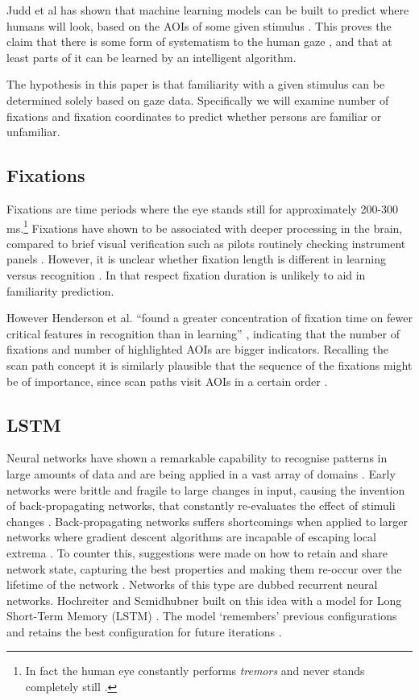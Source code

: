 \documentclass{llncs}
\begin{document}
Judd et al has shown that machine learning models can be built to predict where humans will look, based on the AOIs of some given stimulus \cite{judd2009}. This proves the claim that there is some form of systematism to the human gaze \cite{noton1971,holmqvist2011,judd2009,rayner1998}, and that at least parts of it can be learned by an intelligent algorithm.

The hypothesis in this paper is that familiarity with a given stimulus can be determined solely based on gaze data.
Specifically we will examine number of fixations and fixation coordinates to predict whether persons are familiar or unfamiliar.

\subsection{Fixations}
Fixations are time periods where the eye stands still for approximately 200-300 ms\cite{holmqvist2011}.\footnote{In fact the human  
eye constantly performs \textit{tremors} and never stands completely still \cite{holmqvist2011}.} Fixations have shown to be
associated with deeper processing in the brain, compared to brief visual verification such as pilots routinely checking
instrument panels \cite{rayner1998, holmqvist2011}. However, it is unclear whether fixation length is different in learning 
versus recognition \cite{henderson2005}. In that respect fixation duration is unlikely to aid in familiarity prediction. 

However Henderson et al. ``found a greater concentration of fixation time on fewer critical features in recognition
than in learning'' \cite[p. 104]{henderson2005}, indicating that the number of fixations and number of highlighted AOIs are 
bigger indicators. Recalling the scan path concept it is similarly plausible that the sequence of the fixations might be
of importance, since scan paths visit AOIs in a certain order \cite{holmqvist2011}.

\subsection{LSTM}
Neural networks have shown a remarkable capability to recognise patterns in large amounts of data and are being 
applied in a vast array of domains \cite{schmidhuber2015,nilsson2009}. Early networks were brittle and fragile to large
changes in input, causing the invention of back-propagating networks, that constantly re-evaluates the effect of stimuli
changes \cite{schmidhuber2015,russel2014}. Back-propagating networks suffers shortcomings when applied to larger networks where gradient descent algorithms are incapable of escaping local extrema \cite{russel2014}. To counter this, suggestions were made on how to retain and share network state, capturing the best properties and making them re-occur over the lifetime of the network \cite{russel2014, nilsson2009}. Networks of this type are dubbed recurrent neural networks. Hochreiter and Scmidhubner built on this idea with a model for Long Short-Term Memory (LSTM) \cite{schmidhuber1997}. The model ‘remembers’ previous configurations and retains the best configuration for future iterations \cite{schmidhuber1997, kristensen2017}. 
\end{document}
